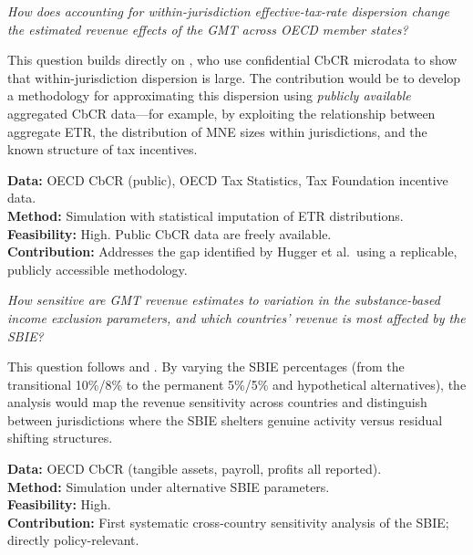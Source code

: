 \documentclass[12pt,a4paper]{article}
\begin{document}
\begin{description}[style=nextline,leftmargin=2cm]

\item[A1. Within-jurisdiction ETR dispersion and GMT revenue.]
\emph{How does accounting for within-jurisdiction effective-tax-rate dispersion change the estimated revenue effects of the GMT across OECD member states?}

This question builds directly on \textcite{hugger2025}, who use confidential CbCR microdata to show that within-jurisdiction dispersion is large.
The contribution would be to develop a methodology for approximating this dispersion using \emph{publicly available} aggregated CbCR data---for example, by exploiting the relationship between aggregate ETR, the distribution of MNE sizes within jurisdictions, and the known structure of tax incentives.

\textbf{Data:} OECD CbCR (public), OECD Tax Statistics, Tax Foundation incentive data.\\
\textbf{Method:} Simulation with statistical imputation of ETR distributions.\\
\textbf{Feasibility:} High.
Public CbCR data are freely available.\\
\textbf{Contribution:} Addresses the gap identified by Hugger et al.\ using a replicable, publicly accessible methodology.

\item[A2. SBIE calibration and revenue sensitivity.]
\emph{How sensitive are GMT revenue estimates to variation in the substance-based income exclusion parameters, and which countries' revenue is most affected by the SBIE?}

This question follows \textcite{devereux2023} and \textcite{schjelderup2024}.
By varying the SBIE percentages (from the transitional 10\%/8\% to the permanent 5\%/5\% and hypothetical alternatives), the analysis would map the revenue sensitivity across countries and distinguish between jurisdictions where the SBIE shelters genuine activity versus residual shifting structures.

\textbf{Data:} OECD CbCR (tangible assets, payroll, profits all reported).\\
\textbf{Method:} Simulation under alternative SBIE parameters.\\
\textbf{Feasibility:} High.\\
\textbf{Contribution:} First systematic cross-country sensitivity analysis of the SBIE; directly policy-relevant.


\end{description}
\end{document}
